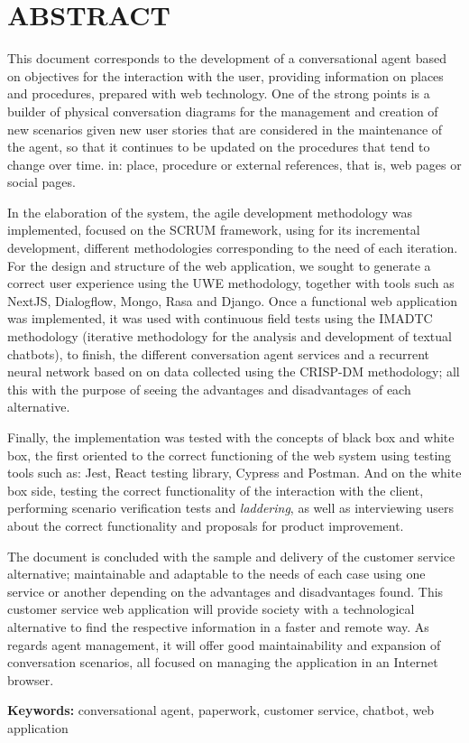 \documentclass[letter, openright, 12pt]{book}
\begin{document}
\newpage
\chapter*{\centering ABSTRACT}
\noindent
This document corresponds to the development of a conversational agent based on objectives for the interaction with the user, providing information on places and procedures, prepared with web technology. One of the strong points is a builder of physical conversation diagrams for the management and creation of new scenarios given new user stories that are considered in the maintenance of the agent, so that it continues to be updated on the procedures that tend to change over time. in: place, procedure or external references, that is, web pages or social pages.
\par\noindent
In the elaboration of the system, the agile development methodology was implemented, focused on the SCRUM framework, using for its incremental development, different methodologies corresponding to the need of each iteration. For the design and structure of the web application, we sought to generate a correct user experience using the UWE methodology, together with tools such as NextJS, Dialogflow, Mongo, Rasa and Django. Once a functional web application was implemented, it was used with continuous field tests using the IMADTC methodology (iterative methodology for the analysis and development of textual chatbots), to finish, the different conversation agent services and a recurrent neural network based on on data collected using the CRISP-DM methodology; all this with the purpose of seeing the advantages and disadvantages of each alternative.
\par \noindent
Finally, the implementation was tested with the concepts of black box and white box, the first oriented to the correct functioning of the web system using testing tools such as: Jest, React testing library, Cypress and Postman. And on the white box side, testing the correct functionality of the interaction with the client, performing scenario verification tests and \textit{laddering}, as well as interviewing users about the correct functionality and proposals for product improvement.
\par \noindent
The document is concluded with the sample and delivery of the customer service alternative; maintainable and adaptable to the needs of each case using one service or another depending on the advantages and disadvantages found. This customer service web application will provide society with a technological alternative to find the respective information in a faster and remote way. As regards agent management, it will offer good maintainability and expansion of conversation scenarios, all focused on managing the application in an Internet browser.
\par \noindent
\textbf{Keywords:} conversational agent, paperwork, customer service, chatbot, web application
\end{document}
